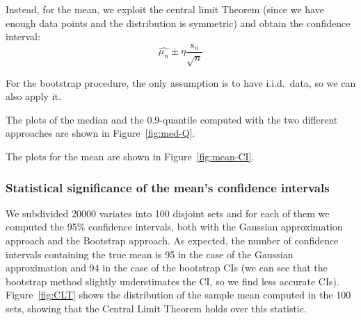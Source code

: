 \documentclass[a4paper]{article}
\begin{document}
Instead, for the mean, we exploit the central limit Theorem (since we
have enough data points and the distribution is symmetric) and obtain
the confidence interval:
\begin{equation*}
  \hat{\mu_n} \pm \eta\frac{s_n}{\sqrt{n}}
\end{equation*}

For the bootstrap procedure, the only assumption is to have
i.i.d.\ data, so we can also apply it.

The plots of the median and the 0.9-quantile computed with the two
different approaches are shown in Figure~\ref{fig:med-Q}.

The plots for the mean are shown in Figure~\ref{fig:mean-CI}.

\subsubsection*{Statistical significance of the mean's confidence intervals}

We subdivided 20000 variates into 100 disjoint sets and for each of
them we computed the 95\% confidence intervals, both with the
Gaussian approximation approach and the Bootstrap approach. As
expected, the number of confidence intervals containing the true mean
is 95 in the case of the Gaussian approximation and 94 in the case of
the bootstrap CIs (we can see that the bootstrap method slightly
understimates the CI, so we find less accurate CIs).
Figure~\ref{fig:CLT} shows the distribution of the sample mean
computed in the 100 sets, showing that the Central Limit Theorem
holds over this statistic.
\end{document}
